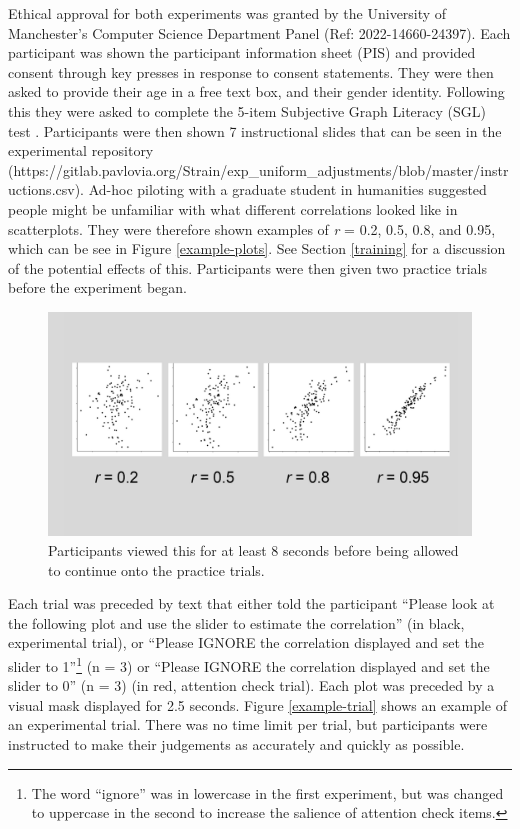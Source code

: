 \documentclass[preprint, 3p,
authoryear]{elsarticle} %
\begin{document}
Ethical approval for both experiments was granted by the University of
Manchester's Computer Science Department Panel (Ref: 2022-14660-24397).
Each participant was shown the participant information sheet (PIS) and
provided consent through key presses in response to consent statements.
They were then asked to provide their age in a free text box, and their
gender identity. Following this they were asked to complete the 5-item
Subjective Graph Literacy (SGL) test \citep{garcia_2016}. Participants
were then shown 7 instructional slides that can be seen in the
experimental repository
(https://gitlab.pavlovia.org/Strain/exp\_uniform\_adjustments/blob/master/instructions.csv).
Ad-hoc piloting with a graduate student in humanities suggested people
might be unfamiliar with what different correlations looked like in
scatterplots. They were therefore shown examples of \emph{r} = 0.2, 0.5,
0.8, and 0.95, which can be see in Figure \ref{example-plots}. See
Section \ref{training} for a discussion of the potential effects of
this. Participants were then given two practice trials before the
experiment began.

\begin{figure}

\includegraphics[width=0.5\linewidth]{images/example-plots} \hfill{}

\caption{\label{example-plots}Participants viewed this for at least 8 seconds before being allowed to continue onto the practice trials.}\label{fig:example-plots}
\end{figure}

Each trial was preceded by text that either told the participant
``Please look at the following plot and use the slider to estimate the
correlation'' (in black, experimental trial), or ``Please IGNORE the
correlation displayed and set the slider to 1''\footnote{The word
  ``ignore'' was in lowercase in the first experiment, but was changed
  to uppercase in the second to increase the salience of attention check
  items.} (n = 3) or ``Please IGNORE the correlation displayed and set
the slider to 0'' (n = 3) (in red, attention check trial). Each plot was
preceded by a visual mask displayed for 2.5 seconds. Figure
\ref{example-trial} shows an example of an experimental trial. There was
no time limit per trial, but participants were instructed to make their
judgements as accurately and quickly as possible.
\end{document}
